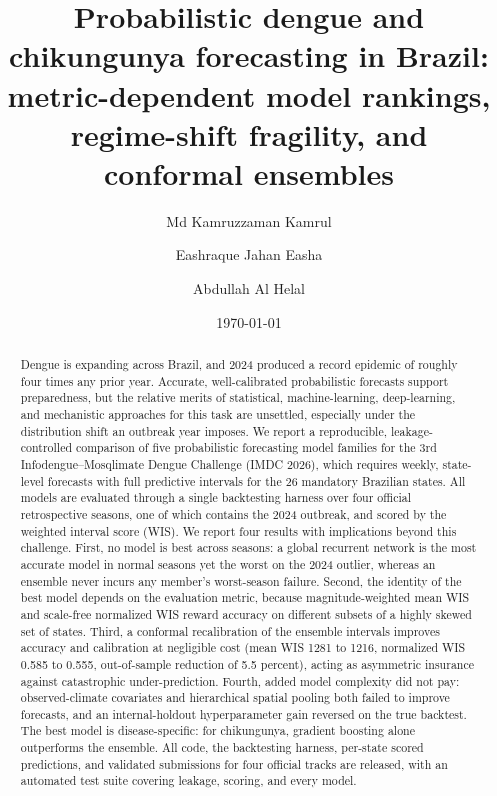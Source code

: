 \documentclass[11pt]{article}
\title{\textbf{Probabilistic dengue and chikungunya forecasting in Brazil:\\
metric-dependent model rankings, regime-shift fragility, and conformal ensembles}}
\author[1]{Md Kamruzzaman Kamrul}
\author[2]{Eashraque Jahan Easha}
\author[3]{Abdullah Al Helal}
\affil[1]{Purdue University, West Lafayette, IN, USA}
\affil[2]{University of Denver, Denver, CO, USA}
\affil[3]{Oklahoma State University, Stillwater, OK, USA}
\date{\today}
\begin{document}
\maketitle

\begin{abstract}
\noindent
Dengue is expanding across Brazil, and 2024 produced a record epidemic of roughly four times any
prior year. Accurate, well-calibrated probabilistic forecasts support preparedness, but the
relative merits of statistical, machine-learning, deep-learning, and mechanistic approaches for
this task are unsettled, especially under the distribution shift an outbreak year imposes. We
report a reproducible, leakage-controlled comparison of five probabilistic forecasting model
families for the 3rd Infodengue--Mosqlimate Dengue Challenge (IMDC 2026), which requires weekly,
state-level forecasts with full predictive intervals for the 26 mandatory Brazilian states. All
models are evaluated through a single backtesting harness over four official retrospective seasons,
one of which contains the 2024 outbreak, and scored by the weighted interval score (WIS). We report
four results with implications beyond this challenge. First, no model is best across seasons: a
global recurrent network is the most accurate model in normal seasons yet the worst on the 2024
outlier, whereas an ensemble never incurs any member's worst-season failure. Second, the identity
of the best model depends on the evaluation metric, because magnitude-weighted mean WIS and
scale-free normalized WIS reward accuracy on different subsets of a highly skewed set of states.
Third, a conformal recalibration of the ensemble intervals improves accuracy and calibration at
negligible cost (mean WIS 1281 to 1216, normalized WIS 0.585 to 0.555, out-of-sample reduction of
5.5 percent), acting as asymmetric insurance against catastrophic under-prediction. Fourth, added
model complexity did not pay: observed-climate covariates and hierarchical spatial pooling both
failed to improve forecasts, and an internal-holdout hyperparameter gain reversed on the true
backtest. The best model is disease-specific: for chikungunya, gradient boosting alone outperforms
the ensemble. All code, the backtesting harness, per-state scored predictions, and validated
submissions for four official tracks are released, with an automated test suite covering leakage,
scoring, and every model.
\end{abstract}
\end{document}
